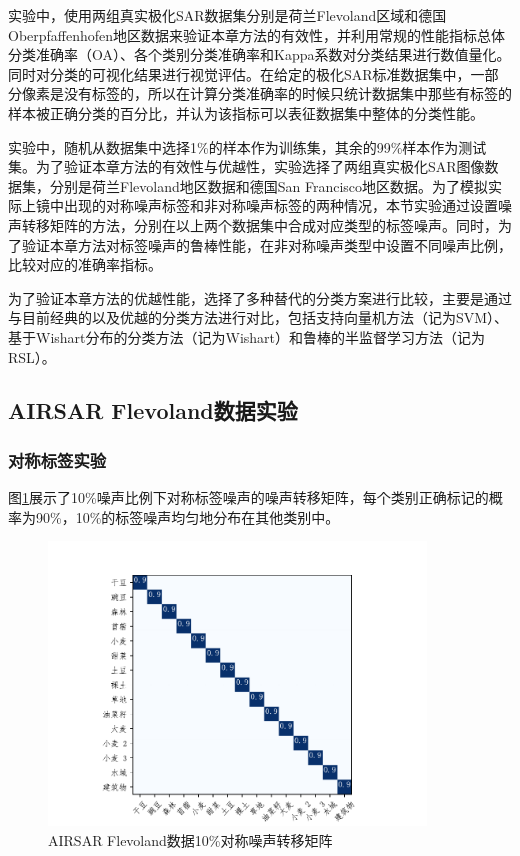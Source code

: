 实验中，使用两组真实极化SAR数据集分别是荷兰Flevoland区域和德国Oberpfaffenhofen地区数据来验证本章方法的有效性，并利用常规的性能指标总体分类准确率（OA）、各个类别分类准确率和Kappa系数对分类结果进行数值量化。同时对分类的可视化结果进行视觉评估。在给定的极化SAR标准数据集中，一部分像素是没有标签的，所以在计算分类准确率的时候只统计数据集中那些有标签的样本被正确分类的百分比，并认为该指标可以表征数据集中整体的分类性能。

实验中，随机从数据集中选择1\%的样本作为训练集，其余的99\%样本作为测试集。为了验证本章方法的有效性与优越性，实验选择了两组真实极化SAR图像数据集，分别是荷兰Flevoland地区数据和德国San Francisco地区数据。为了模拟实际上镜中出现的对称噪声标签和非对称噪声标签的两种情况，本节实验通过设置噪声转移矩阵的方法，分别在以上两个数据集中合成对应类型的标签噪声。同时，为了验证本章方法对标签噪声的鲁棒性能，在非对称噪声类型中设置不同噪声比例，比较对应的准确率指标。

为了验证本章方法的优越性能，选择了多种替代的分类方案进行比较，主要是通过与目前经典的以及优越的分类方法进行对比，包括支持向量机方法（记为SVM）、基于Wishart分布的分类方法（记为Wishart）和鲁棒的半监督学习方法（记为RSL）。


\subsection{AIRSAR Flevoland数据实验}
\subsubsection{对称标签实验}
图\ref{fig:fle_noise_uniform}展示了10\%噪声比例下对称标签噪声的噪声转移矩阵，每个类别正确标记的概率为90\%，10\%的标签噪声均匀地分布在其他类别中。
\begin{figure}[h]
    \centering
    \includegraphics[width=10.04cm]{pic/chapter4/fle/noise_uniform.pdf}
    \caption{AIRSAR Flevoland数据10\%对称噪声转移矩阵}
    \label{fig:fle_noise_uniform}
\end{figure}

